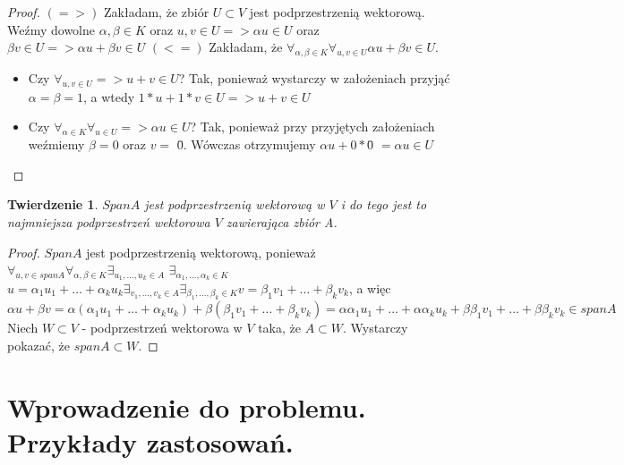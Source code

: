 \documentclass[12pt,a4paper]{article}
\newtheorem{twr}{Twierdzenie}[section]
\begin{document}
\begin{proof}
$(=>)$ Zak{\l}adam, \.{z}e zbi\'{o}r $U \subset V$ jest podprzestrzeni\k{a} wektorow\k{a}. We\'{z}my dowolne $\alpha, \beta \in K$ oraz $u, v \in U => \alpha u \in U$ oraz $\beta v \in U => \alpha u + \beta v \in U$
\newline
$(<=)$ Zak{\l}adam, \.{z}e $\forall_{\alpha, \beta \in K} \forall_{u, v \in U} \alpha u + \beta v \in U$.
\begin{itemize}
\item Czy $\forall_{u, v \in U} => u+v \in U$? Tak, poniewa\.{z} wystarczy w za{\l}o\.{z}eniach przyj\k{a}\'{c} $\alpha = \beta = 1$, a wtedy $1*u+1*v \in U => u + v \in U$
\item Czy $\forall_{\alpha \in K} \forall_{u \in U} => \alpha u \in U$? Tak, poniewa\.{z} przy przyj\k{e}tych za{\l}o\.{z}eniach we\'{z}miemy $\beta = 0$ oraz $v =$ \={0}. W\'{o}wczas otrzymujemy $\alpha u + 0 *$\={0} $= \alpha u \in U$
\end{itemize}
\end{proof}

\begin{twr}
$Span A$ jest podprzestrzeni\k{a} wektorow\k{a} w $V$ i do tego jest to najmniejsza podprzestrze\'{n} wektorowa $V$ zawieraj\k{a}ca zbi\'{o}r A.
\end{twr}
\begin{proof}
$Span A$ jest podprzestrzeni\k{a} wektorow\k{a}, poniewa\.{z} \newline $\forall_{u, v \in span A} \forall_{\alpha, \beta \in K} \exists_{u_{1}, \dots, u_{k} \in A}$ $ \exists_{\alpha_{1}, \dots, \alpha_{k} \in K}$ $u = \alpha_{1}u_{1} + \dots + \alpha_{k}u_{k} \exists_{v_{1}, \dots, v_{k} \in A} \exists_{\beta_{1}, \dots, \beta_{k} \in K} v = \beta_{1}v_{1}  + \dots + \beta_{k}v_{k}$, a wi\k{e}c $\alpha u + \beta v = \alpha (\alpha_{1}u_{1} + \dots + \alpha_{k}u_{k}) + \beta (\beta_{1}v_{1} + \dots + \beta_{k}v_{k}) = \alpha \alpha_{1}u_{1}  + \dots + \alpha \alpha_{k}u_{k} + \beta \beta_{1}v_{1} + \dots + \beta \beta_{k}v_{k} \in span A$ \newline
Niech $W \subset V$ - podprzestrze\'{n} wektorowa w $V$ taka, \.{z}e $A \subset W$. Wystarczy pokaza\'{c}, \.{z}e $span A \subset W$.
\end{proof}

\section{Wprowadzenie do problemu. Przyk{\l}ady zastosowa\'{n}.}
\end{document}
